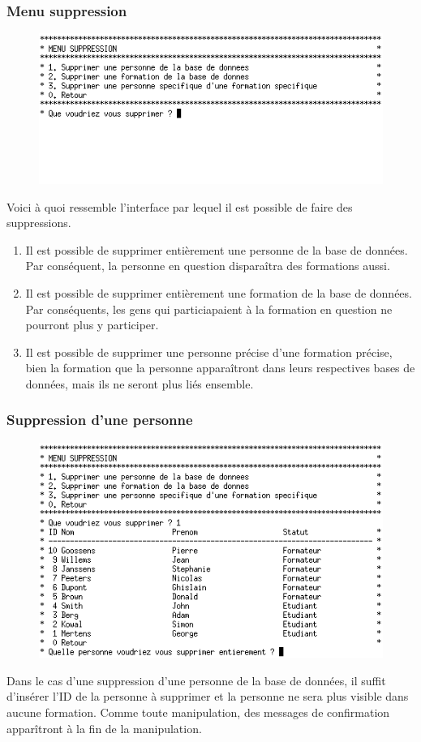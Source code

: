 \documentclass[11pt]{article}
\begin{document}
\newpage
\subsubsection{Menu suppression}
\begin{figure}[ht]
  \centering
  \includegraphics[trim=0 80 0 0, clip, scale=0.8]{images/16.png.png}
\end{figure}

Voici à quoi ressemble l'interface par lequel il est possible de faire des suppressions.
\begin{enumerate}
\item Il est possible de supprimer entièrement une personne de la base de données. Par conséquent, la personne en question disparaîtra des formations aussi.
\item Il est possible de supprimer entièrement une formation de la base de données. Par conséquents, les gens qui particiapaient à la formation en question ne pourront plus y participer.
\item Il est possible de supprimer une personne précise d'une formation précise, bien la formation que la personne apparaîtront dans leurs respectives bases de données, mais ils ne seront plus liés ensemble.
\end{enumerate}

\subsubsection{Suppression d'une personne}
\begin{figure}[ht]
  \centering
  \includegraphics[trim=0 0 0 0, clip, scale=0.8]{images/17.png.png}
\end{figure}
Dans le cas d'une suppression d'une personne de la base de données, il suffit d'insérer l'ID de la personne à supprimer et la personne ne sera plus visible dans aucune formation. Comme toute manipulation, des messages de confirmation apparîtront à la fin de la manipulation.
\end{document}
